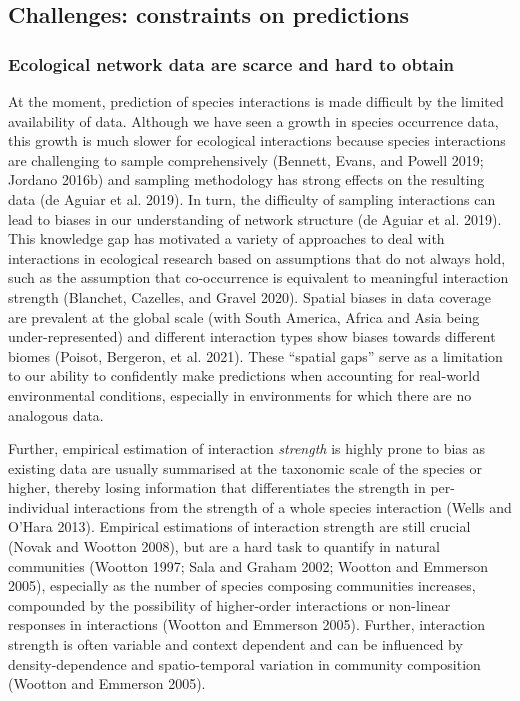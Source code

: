\documentclass[11pt]{article}
\begin{document}
\hypertarget{challenges-constraints-on-predictions}{%
\subsection{Challenges: constraints on
predictions}\label{challenges-constraints-on-predictions}}

\hypertarget{ecological-network-data-are-scarce-and-hard-to-obtain}{%
\subsubsection{Ecological network data are scarce and hard to
obtain}\label{ecological-network-data-are-scarce-and-hard-to-obtain}}

At the moment, prediction of species interactions is made difficult by
the limited availability of data. Although we have seen a growth in
species occurrence data, this growth is much slower for ecological
interactions because species interactions are challenging to sample
comprehensively (Bennett, Evans, and Powell 2019; Jordano 2016b) and
sampling methodology has strong effects on the resulting data (de Aguiar
et al. 2019). In turn, the difficulty of sampling interactions can lead
to biases in our understanding of network structure (de Aguiar et al.
2019). This knowledge gap has motivated a variety of approaches to deal
with interactions in ecological research based on assumptions that do
not always hold, such as the assumption that co-occurrence is equivalent
to meaningful interaction strength (Blanchet, Cazelles, and Gravel
2020). Spatial biases in data coverage are prevalent at the global scale
(with South America, Africa and Asia being under-represented) and
different interaction types show biases towards different biomes
(Poisot, Bergeron, et al. 2021). These ``spatial gaps'' serve as a
limitation to our ability to confidently make predictions when
accounting for real-world environmental conditions, especially in
environments for which there are no analogous data.

Further, empirical estimation of interaction \emph{strength} is highly
prone to bias as existing data are usually summarised at the taxonomic
scale of the species or higher, thereby losing information that
differentiates the strength in per-individual interactions from the
strength of a whole species interaction (Wells and O'Hara 2013).
Empirical estimations of interaction strength are still crucial (Novak
and Wootton 2008), but are a hard task to quantify in natural
communities (Wootton 1997; Sala and Graham 2002; Wootton and Emmerson
2005), especially as the number of species composing communities
increases, compounded by the possibility of higher-order interactions or
non-linear responses in interactions (Wootton and Emmerson 2005).
Further, interaction strength is often variable and context dependent
and can be influenced by density-dependence and spatio-temporal
variation in community composition (Wootton and Emmerson 2005).
\end{document}
